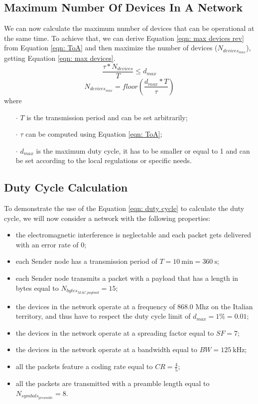 \subsection{Maximum Number Of Devices In A Network}
We can now calculate the maximum number of devices that can be operational at the same time. To achieve that, we can
derive Equation \ref{eqn: max devices rev} from Equation \ref{eqn: ToA} and then maximize the number of devices
($\mathit{N_{devices_{max}}}$), getting Equation \ref{eqn: max devices}.
\begin{equation}
    \label{eqn: max devices rev}
    \frac{\tau * \mathit{N_{devices}}}{T} \leq \mathit{d_{max}}
\end{equation}
\begin{equation}
    \label{eqn: max devices}
    N_{devices_{max}} = \textit{floor} \left( \frac{\mathit{d_{max}} * T}{\tau} \right)
\end{equation}
where
\begin{itemize}[noitemsep,nolistsep]
    \item[\boldmath$\cdot$] $T$ is the transmission period and can be set arbitrarily;
    \item[\boldmath$\cdot$] $\tau$ can be computed using Equation \ref{eqn: ToA};
    \item[\boldmath$\cdot$] $\mathit{d_{max}}$ is the maximum duty cycle, it has to be smaller or equal to 1 and can be
        set according to the local regulations or specific needs.
\end{itemize}

\subsection{Duty Cycle Calculation}
To demonstrate the use of the Equation \ref{eqn: duty cycle} to calculate the duty cycle, we will now consider a network
with the following properties:
\begin{itemize}
    \item the electromagnetic interference is neglectable and each packet gets delivered with an error rate of 0;
    \item each Sender node has a transmission period of $T = 10\ \mathrm{ min} = 360\ \mathrm{s}$;
    \item each Sender node transmits a packet with a payload that has a length in bytes equal to
        $\mathit{N_{bytes_{MAC\_payload}}} = 15$;
    \item the devices in the network operate at a frequency of 868.0 Mhz on the Italian territory, and thus have to
        respect the duty cycle limit of $\mathit{d_{max}} = 1\% = 0.01$;
    \item the devices in the network operate at a spreading factor equal to $\mathit{SF} = 7$;
    \item the devices in the network operate at a bandwidth equal to $\mathit{BW} = 125\ \mathrm{kHz}$;
    \item all the packets feature a coding rate equal to $\mathit{CR} = \frac{4}{5}$;
    \item all the packets are transmitted with a preamble length equal to $\mathit{N_{symbols_{preamble}}} = 8$.
\end{itemize}

